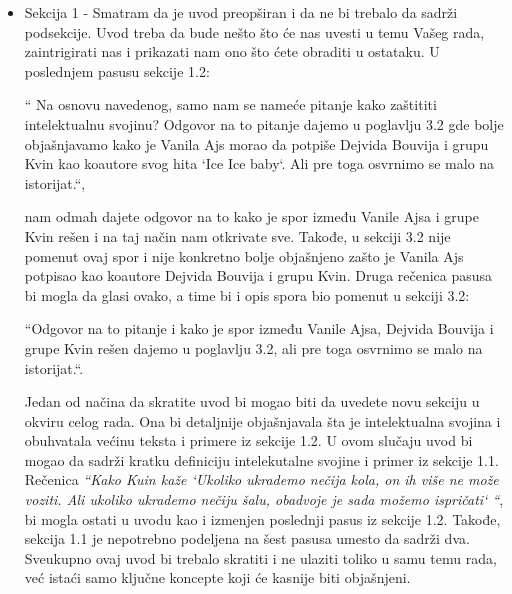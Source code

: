 \documentclass[a4paper]{report}
\begin{document}
\begin{itemize}
	\item Sekcija 1 - Smatram da je uvod preopširan i da ne bi trebalo da sadrži podsekcije. Uvod treba da bude nešto što će nas uvesti u temu Vašeg rada,
	 zaintrigirati nas i prikazati nam ono što ćete obraditi u ostataku. U poslednjem pasusu sekcije 1.2:
	\begin{displayquote}
	`` Na osnovu navedenog, samo nam se nameće pitanje kako zaštititi intelektualnu svojinu? Odgovor na to pitanje dajemo u poglavlju 3.2 gde bolje objašnjavamo 
	kako je Vanila Ajs morao da potpiše Dejvida Bouvija i grupu Kvin kao koautore svog hita `Ice Ice baby`. Ali pre toga osvrnimo se malo na istorijat.``,
	\end{displayquote}
	nam odmah dajete odgovor na to kako je spor između Vanile Ajsa i grupe Kvin rešen i na taj način nam otkrivate sve. Takođe, u sekciji 3.2 nije pomenut ovaj 
	spor i nije konkretno bolje objašnjeno zašto je Vanila Ajs potpisao kao koautore Dejvida Bouvija i grupu Kvin. Druga rečenica pasusa bi mogla da glasi ovako, 
	a time bi i opis spora bio pomenut u sekciji 3.2: 
	\begin{displayquote}
	``Odgovor na to pitanje i kako je spor između Vanile Ajsa, Dejvida Bouvija i grupe Kvin rešen dajemo u poglavlju 3.2, ali pre toga osvrnimo se malo na istorijat.``.
	\end{displayquote} 
	
	
		Jedan od načina da skratite uvod bi mogao biti da uvedete novu sekciju u okviru celog rada.
		Ona bi detaljnije objašnjavala šta je intelektualna svojina i obuhvatala većinu teksta i primere 
		iz sekcije 1.2. U ovom slučaju uvod bi mogao da sadrži kratku definiciju intelekutalne svojine i
		primer iz sekcije 1.1. Rečenica \emph{``Kako Kuin kaže `Ukoliko ukrademo nečija kola, on ih više ne
		može voziti. Ali ukoliko ukrademo nečiju šalu, obadvoje je sada možemo ispričati` ``}, bi mogla ostati u uvodu
		kao i izmenjen poslednji pasus iz sekcije 1.2. Takođe, sekcija 1.1 je nepotrebno podeljena na šest pasusa umesto da sadrži dva.  
		Sveukupno ovaj uvod bi trebalo skratiti i ne ulaziti toliko u samu temu rada, već istaći samo ključne koncepte koji će kasnije biti objašnjeni.
	

\end{itemize}
\end{document}
